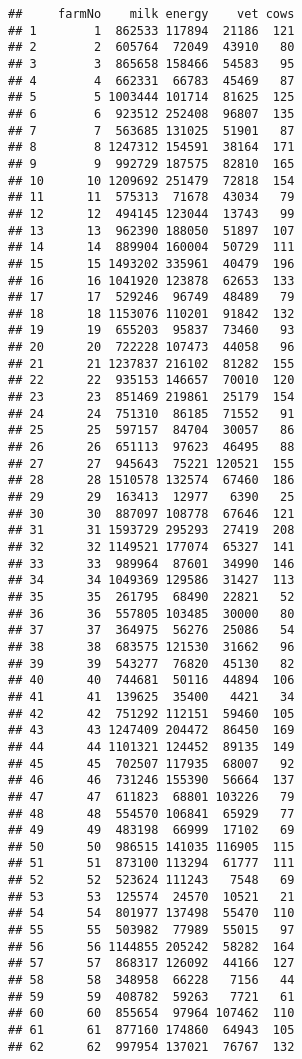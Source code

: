 \documentclass[
]{article}
\begin{document}
\begin{verbatim}
##     farmNo    milk energy    vet cows
## 1        1  862533 117894  21186  121
## 2        2  605764  72049  43910   80
## 3        3  865658 158466  54583   95
## 4        4  662331  66783  45469   87
## 5        5 1003444 101714  81625  125
## 6        6  923512 252408  96807  135
## 7        7  563685 131025  51901   87
## 8        8 1247312 154591  38164  171
## 9        9  992729 187575  82810  165
## 10      10 1209692 251479  72818  154
## 11      11  575313  71678  43034   79
## 12      12  494145 123044  13743   99
## 13      13  962390 188050  51897  107
## 14      14  889904 160004  50729  111
## 15      15 1493202 335961  40479  196
## 16      16 1041920 123878  62653  133
## 17      17  529246  96749  48489   79
## 18      18 1153076 110201  91842  132
## 19      19  655203  95837  73460   93
## 20      20  722228 107473  44058   96
## 21      21 1237837 216102  81282  155
## 22      22  935153 146657  70010  120
## 23      23  851469 219861  25179  154
## 24      24  751310  86185  71552   91
## 25      25  597157  84704  30057   86
## 26      26  651113  97623  46495   88
## 27      27  945643  75221 120521  155
## 28      28 1510578 132574  67460  186
## 29      29  163413  12977   6390   25
## 30      30  887097 108778  67646  121
## 31      31 1593729 295293  27419  208
## 32      32 1149521 177074  65327  141
## 33      33  989964  87601  34990  146
## 34      34 1049369 129586  31427  113
## 35      35  261795  68490  22821   52
## 36      36  557805 103485  30000   80
## 37      37  364975  56276  25086   54
## 38      38  683575 121530  31662   96
## 39      39  543277  76820  45130   82
## 40      40  744681  50116  44894  106
## 41      41  139625  35400   4421   34
## 42      42  751292 112151  59460  105
## 43      43 1247409 204472  86450  169
## 44      44 1101321 124452  89135  149
## 45      45  702507 117935  68007   92
## 46      46  731246 155390  56664  137
## 47      47  611823  68801 103226   79
## 48      48  554570 106841  65929   77
## 49      49  483198  66999  17102   69
## 50      50  986515 141035 116905  115
## 51      51  873100 113294  61777  111
## 52      52  523624 111243   7548   69
## 53      53  125574  24570  10521   21
## 54      54  801977 137498  55470  110
## 55      55  503982  77989  55015   97
## 56      56 1144855 205242  58282  164
## 57      57  868317 126092  44166  127
## 58      58  348958  66228   7156   44
## 59      59  408782  59263   7721   61
## 60      60  855654  97964 107462  110
## 61      61  877160 174860  64943  105
## 62      62  997954 137021  76767  132

\end{verbatim}
\end{document}
